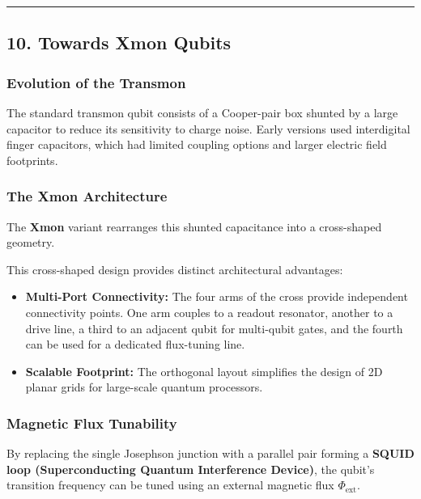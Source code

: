 \documentclass[
]{article}
\providecommand{\tightlist}{%
  \setlength{\itemsep}{0pt}\setlength{\parskip}{0pt}}
\begin{document}
\begin{center}\rule{0.5\linewidth}{0.5pt}\end{center}

\subsection{10. Towards Xmon Qubits}\label{towards-xmon-qubits}

\subsubsection{Evolution of the
Transmon}\label{evolution-of-the-transmon}

The standard transmon qubit consists of a Cooper-pair box shunted by a
large capacitor to reduce its sensitivity to charge noise. Early
versions used interdigital finger capacitors, which had limited coupling
options and larger electric field footprints.

\subsubsection{The Xmon Architecture}\label{the-xmon-architecture}

The \textbf{Xmon} variant rearranges this shunted capacitance into a
cross-shaped geometry.

This cross-shaped design provides distinct architectural advantages:

\begin{itemize}
\tightlist
\item
  \textbf{Multi-Port Connectivity:} The four arms of the cross provide
  independent connectivity points. One arm couples to a readout
  resonator, another to a drive line, a third to an adjacent qubit for
  multi-qubit gates, and the fourth can be used for a dedicated
  flux-tuning line.
\item
  \textbf{Scalable Footprint:} The orthogonal layout simplifies the
  design of 2D planar grids for large-scale quantum processors.
\end{itemize}

\subsubsection{Magnetic Flux Tunability}\label{magnetic-flux-tunability}

By replacing the single Josephson junction with a parallel pair forming
a \textbf{SQUID loop (Superconducting Quantum Interference Device)}, the
qubit's transition frequency can be tuned using an external magnetic
flux \(\Phi_{\text{ext}}\).
\end{document}

